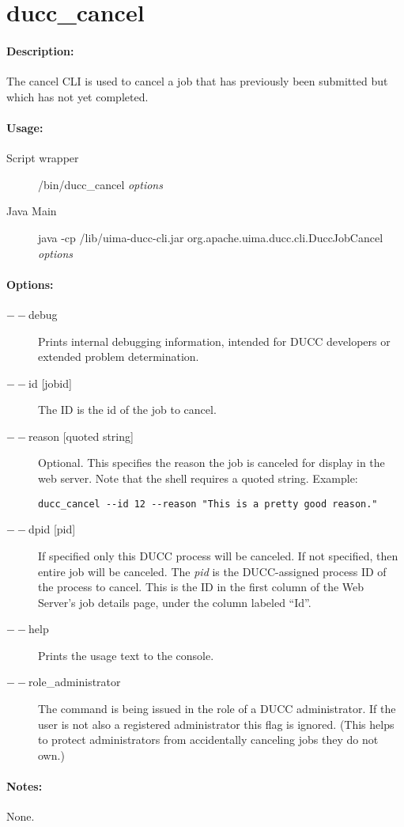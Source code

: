 \ifpdf
\else
{}
\fi
    \section{ducc\_cancel}
    \label{sec:cli.ducc-cancel}

    \paragraph{Description:}
    The cancel CLI is used to cancel a job that has previously been submitted but which has not yet 
    completed. 

    \paragraph{Usage:}
    \begin{description}
    \item[Script wrapper] \ducchome/bin/ducc\_cancel {\em options}
    \item[Java Main]      java -cp \ducchome/lib/uima-ducc-cli.jar org.apache.uima.ducc.cli.DuccJobCancel {\em options}
    \end{description}

    \paragraph{Options:}
    \begin{description}
        \item[$--$debug ]          
          Prints internal debugging information, intended for DUCC developers or extended problem determination.                    
        \item[$--$id {[jobid]}]
          The ID is the id of the job to cancel.
        \item[$--$reason {[quoted string]}]
          Optional. This specifies the reason the job is canceled for display in the web server. Note that
          the shell requires a quoted string.  Example:
\begin{verbatim}
ducc_cancel --id 12 --reason "This is a pretty good reason."
\end{verbatim}
        \item[$--$dpid {[pid]}]
          If specified only this DUCC process will be canceled.  If not
          specified, then entire job will be canceled.  The {\em pid} is the DUCC-assigned process ID of the
          process to cancel.  This is the ID in the first column of the Web Server's job details page, under
          the column labeled ``Id''.
        \item[$--$help]
          Prints the usage text to the console. 
        \item[$--$role\_administrator] The command is being issued in the role of a DUCC administrator.
          If the user is not also a registered administrator this flag is ignored.  (This helps to
          protect administrators from accidentally canceling jobs they do not own.)
     \end{description}
        
    \paragraph{Notes:}
    None.

